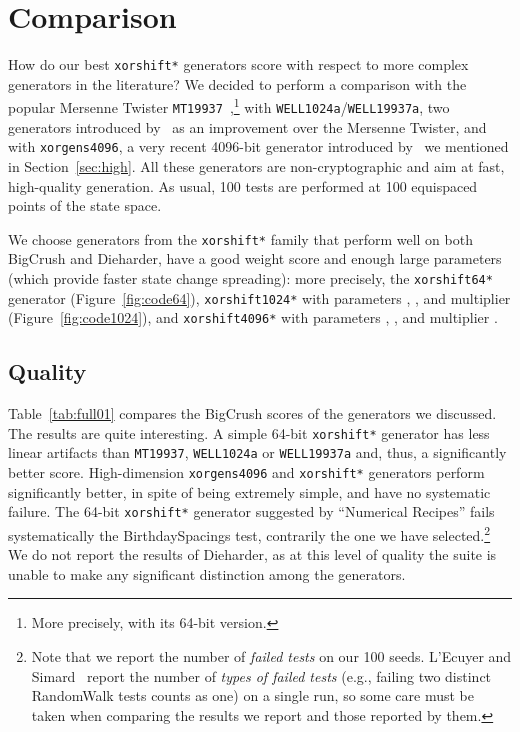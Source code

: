 \documentclass{acmsmalltr}
\newcommand{\xorshifts}[1][]{\texttt{xorshift#1*}\xspace}
\newcommand{\wella}{\texttt{WELL1024a}\xspace}
\newcommand{\wellb}{\texttt{WELL19937a}\xspace}
\newcommand{\mt}[1][]{\texttt{MT19937}\xspace}
\newcommand{\xorgens}[1][]{\texttt{xorgens#1}\xspace}
\begin{document}
\section{Comparison}

How do our best \xorshifts generators score with respect to more complex
generators in the literature? We decided to perform a comparison with the
popular Mersenne Twister \mt~\cite{MaNMT},\footnote{More precisely, with its
64-bit version.} with \wella/\wellb, two generators introduced by~ as an improvement over the Mersenne Twister, and
with \xorgens[4096], a very recent 4096-bit generator introduced by~
we mentioned in Section~\ref{sec:high}. All these generators are
non-cryptographic and aim at fast, high-quality generation.
As usual, 100 tests are performed at 100 equispaced points of the state space.

We choose generators from the \xorshifts family that
perform well on both BigCrush and Dieharder, have a good weight score and enough
large parameters (which provide faster state change spreading): more
precisely, the \xorshifts[64] generator  (Figure~\ref{fig:code64}), 
\xorshifts[1024] with parameters , ,  and multiplier 
(Figure~\ref{fig:code1024}), and \xorshifts[4096] with parameters , , 
and multiplier .

\subsection{Quality}

Table~\ref{tab:full01} compares the BigCrush scores of the generators we discussed. 
The results are quite interesting. A simple 64-bit \xorshifts
generator has less linear artifacts than \mt, \wella or \wellb and, thus, a significantly better
score. High-dimension \xorgens[4096] and \xorshifts generators perform significantly
better, in spite of being extremely simple, and have no systematic failure.
The 64-bit \xorshifts generator suggested by ``Numerical Recipes'' fails
systematically the BirthdaySpacings test, contrarily the one we 
have selected.\footnote{Note that we report the number of \emph{failed tests}
on our 100 seeds. L'Ecuyer and Simard~\cite{LESTU01} report the number of \emph{types of failed tests} (e.g.,
failing two distinct RandomWalk tests counts as one) on a single run, so some
care must be taken when comparing the results we report and those reported by
them.}  
We do not report the results of Dieharder, as at this level of quality the suite is 
unable to make any significant distinction among the generators.
\end{document}
